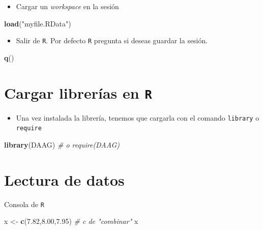 \documentclass[]{book}
\newenvironment{Shaded}{\begin{snugshade}}{\end{snugshade}}
\newcommand{\KeywordTok}[1]{\textcolor[rgb]{0.13,0.29,0.53}{\textbf{#1}}}
\newcommand{\FloatTok}[1]{\textcolor[rgb]{0.00,0.00,0.81}{#1}}
\newcommand{\StringTok}[1]{\textcolor[rgb]{0.31,0.60,0.02}{#1}}
\newcommand{\CommentTok}[1]{\textcolor[rgb]{0.56,0.35,0.01}{\textit{#1}}}
\newcommand{\NormalTok}[1]{#1}
\providecommand{\tightlist}{%
  \setlength{\itemsep}{0pt}\setlength{\parskip}{0pt}}
\begin{document}
\begin{itemize}
\tightlist
\item
  Cargar un \emph{workspace} en la sesión
\end{itemize}

\begin{Shaded}
\begin{Highlighting}[]
\KeywordTok{load}\NormalTok{(}\StringTok{"myfile.RData"}\NormalTok{) }
\end{Highlighting}
\end{Shaded}

\begin{itemize}
\tightlist
\item
  Salir de \texttt{R}. Por defecto \texttt{R} pregunta si deseas guardar
  la sesión.
\end{itemize}

\begin{Shaded}
\begin{Highlighting}[]
\KeywordTok{q}\NormalTok{()}
\end{Highlighting}
\end{Shaded}

\section{\texorpdfstring{Cargar librerías en
\texttt{R}}{Cargar librerías en R}}\label{cargar-librerias-en-r}

\begin{itemize}
\tightlist
\item
  Una vez instalada la librería, tenemos que cargarla con el comando
  \texttt{library} o \texttt{require}
\end{itemize}

\begin{Shaded}
\begin{Highlighting}[]
\KeywordTok{library}\NormalTok{(DAAG) }\CommentTok{# o require(DAAG)}
\end{Highlighting}
\end{Shaded}

\section{Lectura de datos}\label{lectura-de-datos}

Consola de \texttt{R}

\begin{Shaded}
\begin{Highlighting}[]
\NormalTok{x <-}\StringTok{ }\KeywordTok{c}\NormalTok{(}\FloatTok{7.82}\NormalTok{,}\FloatTok{8.00}\NormalTok{,}\FloatTok{7.95}\NormalTok{) }\CommentTok{# c de "combinar"}
\NormalTok{x}
\end{Highlighting}
\end{Shaded}
\end{document}
